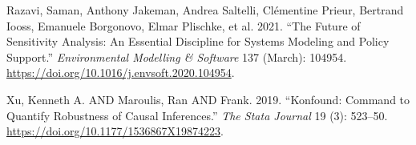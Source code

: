 \documentclass[
]{article}
\newlength{\cslhangindent}
\newlength{\cslentryspacingunit} %
\newenvironment{CSLReferences}[2] %
 {%
  \setlength{\parindent}{0pt}
  \ifodd #1
  \let\oldpar\par
  \def\par{\hangindent=\cslhangindent\oldpar}
  \fi
  \setlength{\parskip}{#2\cslentryspacingunit}
 }%
 {}
\begin{document}
\begin{CSLReferences}{1}{0}
\leavevmode{}%
Razavi, Saman, Anthony Jakeman, Andrea Saltelli, Clémentine Prieur,
Bertrand Iooss, Emanuele Borgonovo, Elmar Plischke, et al. 2021. {``The
{Future} of {Sensitivity} {Analysis}: {An} Essential Discipline for
Systems Modeling and Policy Support.''} \emph{Environmental Modelling \&
Software} 137 (March): 104954.
\url{https://doi.org/10.1016/j.envsoft.2020.104954}.

\leavevmode{}%
Xu, Kenneth A. AND Maroulis, Ran AND Frank. 2019. {``Konfound: Command
to Quantify Robustness of Causal Inferences.''} \emph{The Stata Journal}
19 (3): 523--50. \url{https://doi.org/10.1177/1536867X19874223}.

\end{CSLReferences}
\end{document}

